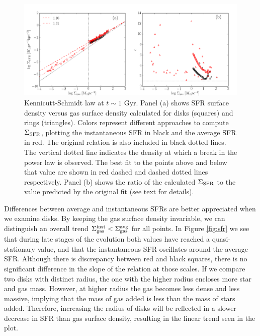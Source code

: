 \documentclass[twocolumn]{aastex}
\newcommand{\ssfr}{\Sigma_{\rm SFR}}
\newcommand{\sgas}{\Sigma_{\rm gas}}
\begin{document}
	\begin{figure}[h]
	\begin{center}
	\includegraphics[scale=0.47]{./f8.png}
	\caption{Kennicutt-Schmidt law at $t \sim 1$ Gyr. Panel (a) shows SFR surface density versus gas surface density calculated for disks (squares) and rings (triangles). Colors represent different approaches to compute $\ssfr$, plotting the instantaneous SFR in black and the average SFR in red. The original \citet{K98} relation is also included in black dotted lines. The vertical dotted line indicates the density at which a break in the power law is observed. The best fit to the points above and below that value are shown in red dashed and dashed dotted lines respectively. Panel (b) shows the ratio of the calculated $\ssfr$ to the value predicted by the \citet{K98} original fit (see text for details).}
	\label{fig:kslaw}
	\end{center}
	\end{figure}
	

Differences between average and instantaneous SFRs are better appreciated when we examine disks. By keeping the gas surface density invariable, we can distinguish an overall trend $\sgas^{\rm inst} < \sgas^{\rm avg}$ for all points. In Figure \ref{fig:sfr} we see that during late stages of the evolution both values have reached a quasi-stationary value, and that the instantaneous SFR oscillates around the average SFR. Although there is discrepancy between red and black squares, there is no significant difference in the slope of the relation at those scales. If we compare two disks with distinct radius, the one with the higher radius encloses more star and gas mass. However, at higher radius the gas becomes less dense and less massive, implying that the mass of gas added is less than the mass of stars added. Therefore, increasing the radius of disks will be reflected in a slower decrease in SFR than gas surface density, resulting in the linear trend seen in the plot.
\end{document}
